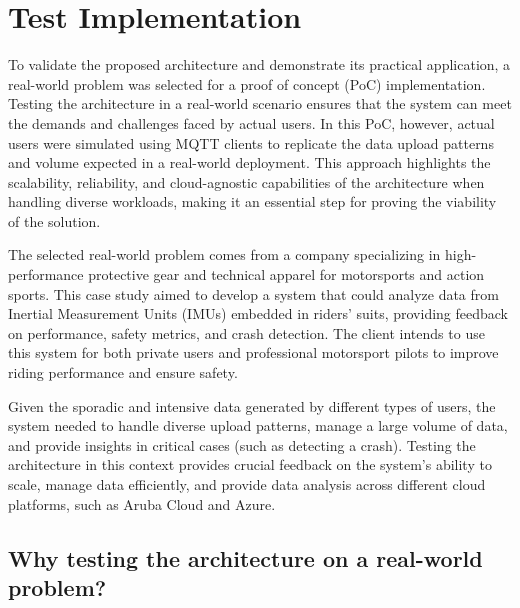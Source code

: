 \chapter{Test Implementation}
\label{cap:real_implementation}

To validate the proposed architecture and demonstrate its practical application, a real-world problem was selected for a proof of concept (PoC) implementation. Testing the architecture in a real-world scenario ensures that the system can meet the demands and challenges faced by actual users. In this PoC, however, actual users were simulated using MQTT clients to replicate the data upload patterns and volume expected in a real-world deployment. This approach highlights the scalability, reliability, and cloud-agnostic capabilities of the architecture when handling diverse workloads, making it an essential step for proving the viability of the solution.

The selected real-world problem comes from a company specializing in high-performance protective gear and technical apparel for motorsports and action sports. This case study aimed to develop a system that could analyze data from Inertial Measurement Units (IMUs) embedded in riders’ suits, providing feedback on performance, safety metrics, and crash detection. The client intends to use this system for both private users and professional motorsport pilots to improve riding performance and ensure safety.

Given the sporadic and intensive data generated by different types of users, the system needed to handle diverse upload patterns, manage a large volume of data, and provide insights in critical cases (such as detecting a crash). Testing the architecture in this context provides crucial feedback on the system’s ability to scale, manage data efficiently, and provide data analysis across different cloud platforms, such as Aruba Cloud and Azure.

\section{Why testing the architecture on a real-world problem?}
\label{sec:real_world_problem}


